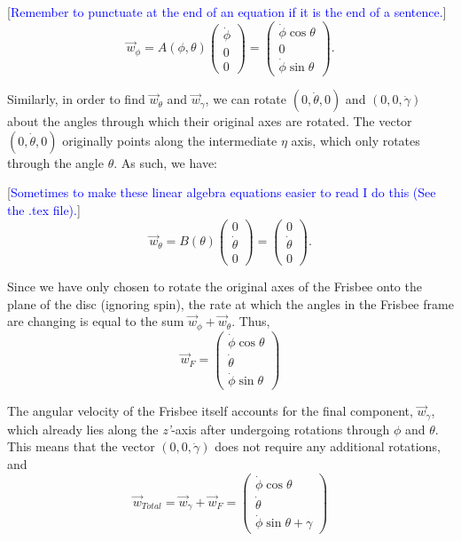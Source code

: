 \documentclass[a4paper,12pt, oneside]{article}
\newcommand{\blue}[1]{\textcolor{blue}{#1}}
\begin{document}
[\blue{Remember to punctuate at the end of an equation if it is the end of a sentence.}]
\begin{equation*}
\vec{w}_\phi=A(\phi,\theta)\left(\begin{array}{ccc}\dot\phi\\0\\0\end{array} \right)=\left(\begin{array}{ccc}\dot\phi\cos\theta\\0\\\dot\phi\sin\theta\end{array} \right).
\end{equation*}

Similarly, in order to find $\vec{w}_\theta$ and $\vec{w}_\gamma$, we can rotate $(0, \dot\theta, 0)$ and $(0, 0, \dot\gamma)$ about the angles through which their original axes are rotated. The vector $(0, \dot\theta, 0)$ originally points along the intermediate $\eta$ axis, which only rotates through the angle $\theta$. As such, we have:

[\blue{Sometimes to make these linear algebra equations easier to read I do this (See the .tex file).}]
\begin{equation*}
  \vec{w}_\theta=B(\theta)\left(\begin{array}{ccc}
    0\\
    \dot\theta \\
    0
  \end{array} 
  \right)=\left(\begin{array}{ccc}
    0 \\ 
    \dot\theta \\
    0
  \end{array}\right).
\end{equation*}

Since we have only chosen to rotate the original axes of the Frisbee onto the plane of the disc (ignoring spin), the rate at which the angles in the Frisbee frame are changing is equal to the sum $\vec{w}_\phi+\vec{w}_\theta$. Thus,
\begin{equation*}
\vec{w}_F=\left(\begin{array}{ccc}\dot\phi\cos\theta\\\dot\theta\\\dot\phi\sin\theta\end{array} \right)
\end{equation*}

The angular velocity of the Frisbee itself accounts for the final component, $\vec{w}_\gamma$, which already lies along the \textit{z'}-axis after undergoing rotations through $\phi$ and $\theta$. This means that the vector $(0, 0, \dot\gamma)$ does not require any additional rotations, and 
\begin{equation*}
\vec{w}_{Total}=\vec{w}_\gamma+\vec{w}_F=\left(\begin{array}{ccc}\dot\phi\cos\theta\\\dot\theta\\\dot\phi\sin\theta+\gamma\end{array} \right)
\end{equation*}
\end{document}
